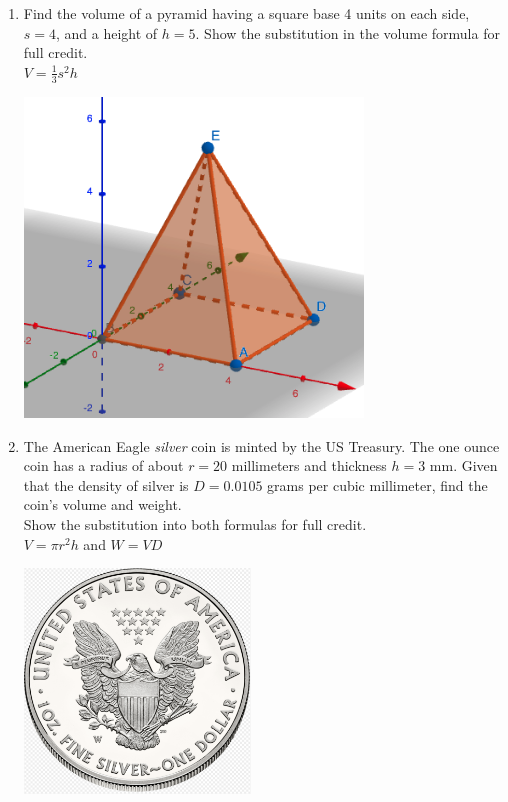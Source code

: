 \begin{enumerate}
\item Find the volume of a pyramid having a square base 4 units on each side, $s=4$, and a height of $h=5$. Show the substitution in the volume formula for full credit. \\[0.5cm]
$\displaystyle V = \frac{1}{3} s^2 h$
  \begin{flushright}
    \includegraphics[width=9cm]{../graphics/04pyramid.png}
  \end{flushright}

\item The American Eagle \emph{silver} coin is minted by the US Treasury. The one ounce coin has a radius of about $r=20$ millimeters and thickness $h=3$ mm. Given that the density of silver is $D = 0.0105$ grams per cubic millimeter, find the coin's volume and weight. \\[0.25cm]
Show the substitution into both formulas for full credit.\\[0.5cm]
$\displaystyle V = \pi r^2 h$ and $W=VD$
  \begin{flushright}
    \includegraphics[width=6cm]{../graphics/04coin.png}
  \end{flushright}


\end{enumerate}
